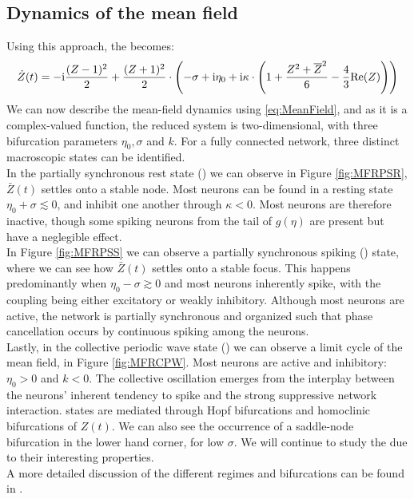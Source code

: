 \subsection{Dynamics of the mean field}
Using this approach, the \MFR becomes:
\begin{align}
\dot{Z}(t)= -\ic \frac{(Z-1)^2}{2}+\frac{(Z+1)^2}{2} \cdot \left(-\sigma+ \ic\eta_{0}
+ \ic \kappa \cdot \left(1+\frac{Z^{2} + \overline{Z}^{2} }{6} - \frac{4}{3} \Re(Z)\right)\right) \label{eq:MeanField}
\end{align}
We can now describe the mean-field dynamics using \eqref{eq:MeanField}, and as it is a complex-valued function, the reduced system is two-dimensional, with three bifurcation parameters $\eta_0, \sigma$ and $k$. For a fully connected network, three distinct macroscopic states can be identified.\\
In the partially synchronous rest state (\PSR) we can observe in Figure \ref{fig:MFRPSR}, $\bar{Z}(t)$ settles onto a stable node. Most neurons can be found in a resting state $\eta_0 + \sigma \lesssim 0$, and inhibit one another through $\kappa < 0$. Most neurons are therefore inactive, though some spiking neurons from the tail of $g(\eta)$ are present but have a neglegible effect. \\
In Figure \ref{fig:MFRPSS} we can observe a partially synchronous spiking (\PSS) state, where we can see how $\bar{Z}(t)$ settles onto a stable focus. This happens predominantly when $\eta_0 - \sigma \gtrsim 0$ and most neurons inherently spike, with the coupling being either excitatory or weakly inhibitory. Although most neurons are active, the network is partially synchronous and organized such that phase cancellation occurs by continuous spiking among the neurons.\\
Lastly, in the collective periodic wave state (\CPW) we can observe a limit cycle of the mean field, in Figure \ref{fig:MFRCPW}. Most neurons are active and inhibitory: $\eta_0 > 0$ and $k < 0$. The collective oscillation emerges from the interplay between the neurons’ inherent tendency to spike and the strong suppressive network interaction. \CPW states are mediated through Hopf bifurcations and homoclinic bifurcations of $Z(t)$. We can also see the occurrence of a saddle-node bifurcation in the lower hand corner, for low $\sigma$. We will continue to study the \CPW due to their interesting properties.\\
A more detailed discussion of the different regimes and bifurcations can be found in \cite{Luke2013}.

